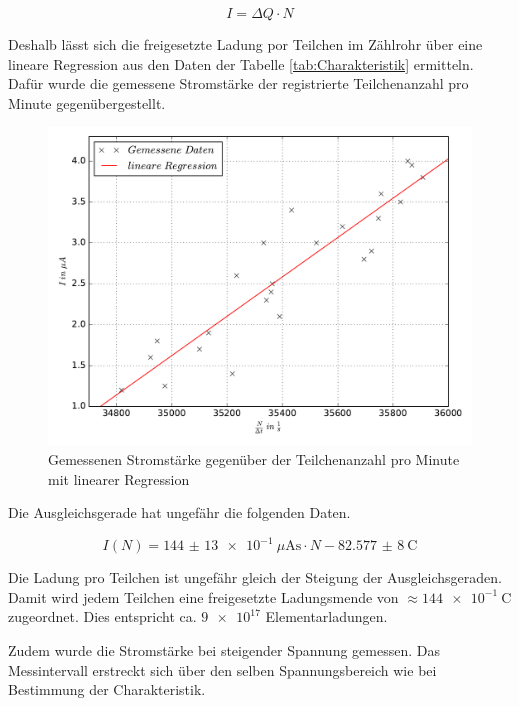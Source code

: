 \begin{equation*}
  I = \Delta Q \cdot N
\end{equation*}

Deshalb lässt sich die freigesetzte Ladung por Teilchen im Zählrohr über eine
lineare Regression aus den Daten der Tabelle \ref{tab:Charakteristik} ermitteln.
Dafür wurde die gemessene Stromstärke der registrierte Teilchenanzahl pro Minute
gegenübergestellt.

\begin{figure}
  \centering
  \includegraphics[width=\textwidth]{Stromstärke_gegen_Anzahl.pdf}
  \caption{Gemessenen Stromstärke gegenüber der Teilchenanzahl pro Minute mit linearer Regression}
  \label{fig:Stromstärke_gegen_Anzahl}
\end{figure}

Die Ausgleichsgerade hat ungefähr die folgenden Daten.

\begin{equation}
  \label{eqn:Augleichsgerade_Ladung}
  I(N) = \SI{144(13)e-1}{\mu\ampere\second}\cdot N - \SI{82,577(8)}{\coulomb}
\end{equation}

Die Ladung pro Teilchen ist ungefähr gleich der Steigung der Ausgleichsgeraden.
Damit wird jedem Teilchen eine freigesetzte Ladungsmende von $\approx \SI{144e-1}{\coulomb}$
zugeordnet. Dies entspricht ca. $\num{9e17}$ Elementarladungen.

Zudem wurde die Stromstärke bei steigender Spannung gemessen. Das Messintervall
erstreckt sich über den selben Spannungsbereich wie bei Bestimmung der Charakteristik.

